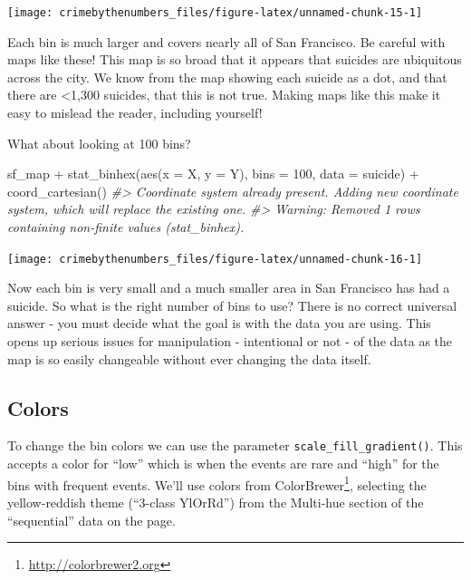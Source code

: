 \documentclass[
]{krantz}
\makeatletter
\newenvironment{Shaded}{\begin{snugshade}}{\end{snugshade}}
\newcommand{\AttributeTok}[1]{\textcolor[rgb]{0.61,0.61,0.61}{#1}}
\newcommand{\CommentTok}[1]{\textcolor[rgb]{0.37,0.37,0.37}{\textit{#1}}}
\newcommand{\DecValTok}[1]{\textcolor[rgb]{0.06,0.06,0.06}{#1}}
\newcommand{\FunctionTok}[1]{\textcolor[rgb]{0,0,0}{#1}}
\newcommand{\NormalTok}[1]{#1}
\newcommand{\SpecialCharTok}[1]{\textcolor[rgb]{0,0,0}{#1}}
\renewcommand{\href}[2]{#2\footnote{\url{#1}}}
\newenvironment{kframe}{%
\medskip{}
\setlength{\fboxsep}{.8em}
 \def\at@end@of@kframe{}%
 \ifinner\ifhmode%
  \def\at@end@of@kframe{\end{minipage}}%
  \begin{minipage}{\columnwidth}%
 \fi\fi%
 \def\FrameCommand##1{\hskip\@totalleftmargin \hskip-\fboxsep
 \colorbox{shadecolor}{##1}\hskip-\fboxsep
     \hskip-\linewidth \hskip-\@totalleftmargin \hskip\columnwidth}%
 \MakeFramed {\advance\hsize-\width
   \@totalleftmargin\z@ \linewidth\hsize
   \@setminipage}}%
 {\par\unskip\endMakeFramed%
 \at@end@of@kframe}
\renewenvironment{Shaded}{\begin{kframe}}{\end{kframe}}
\makeatother
\begin{document}
\begin{center}\texttt{[image: crimebythenumbers\_files/figure-latex/unnamed-chunk-15-1]} \end{center}

Each bin is much larger and covers nearly all of San Francisco. Be careful with maps like these! This map is so broad that it appears that suicides are ubiquitous across the city. We know from the map showing each suicide as a dot, and that there are \textless1,300 suicides, that this is not true. Making maps like this make it easy to mislead the reader, including yourself!

What about looking at 100 bins?

\begin{Shaded}
\begin{Highlighting}[]
\NormalTok{sf\_map }\SpecialCharTok{+}
  \FunctionTok{stat\_binhex}\NormalTok{(}\FunctionTok{aes}\NormalTok{(}\AttributeTok{x =}\NormalTok{ X, }\AttributeTok{y =}\NormalTok{ Y),}
              \AttributeTok{bins =} \DecValTok{100}\NormalTok{,}
              \AttributeTok{data =}\NormalTok{ suicide) }\SpecialCharTok{+}
  \FunctionTok{coord\_cartesian}\NormalTok{() }
\CommentTok{\#\textgreater{} Coordinate system already present. Adding new coordinate system, which will replace the existing one.}
\CommentTok{\#\textgreater{} Warning: Removed 1 rows containing non{-}finite values (stat\_binhex).}
\end{Highlighting}
\end{Shaded}

\begin{center}\texttt{[image: crimebythenumbers\_files/figure-latex/unnamed-chunk-16-1]} \end{center}

Now each bin is very small and a much smaller area in San Francisco has had a suicide. So what is the right number of bins to use? There is no correct universal answer - you must decide what the goal is with the data you are using. This opens up serious issues for manipulation - intentional or not - of the data as the map is so easily changeable without ever changing the data itself.

\hypertarget{colors}{%
\subsection{Colors}\label{colors}}

To change the bin colors we can use the parameter \texttt{scale\_fill\_gradient()}. This accepts a color for ``low'' which is when the events are rare and ``high'' for the bins with frequent events. We'll use colors from \href{http://colorbrewer2.org}{ColorBrewer}, selecting the yellow-reddish theme (``3-class YlOrRd'') from the Multi-hue section of the ``sequential'' data on the page.
\end{document}

